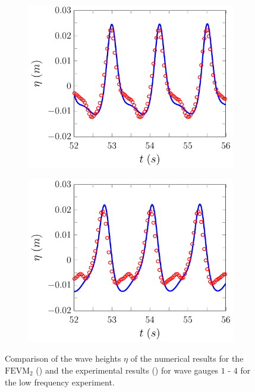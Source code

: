 \begin{figure}
	\begin{subfigure}{0.5\textwidth}
		\includegraphics[width=\textwidth]{./chp6/figures/Experiment/Beji/sh/FEVMWG3.pdf}
		\vspace{0.5cm}
	\end{subfigure}%
	\begin{subfigure}{0.5\textwidth}
		\includegraphics[width=\textwidth]{./chp6/figures/Experiment/Beji/sh/FEVMWG4.pdf}
		\vspace{0.5cm}
	\end{subfigure}
	\caption{Comparison of the wave heights $\eta$ of the numerical results for the $\text{FEVM}_2$ ({\color{blue}\solidrule}) and the experimental results () for wave gauges $1$ - $4$ for the low frequency experiment.}
	\label{fig:BejishWG1to4FEVM}
\end{figure}

